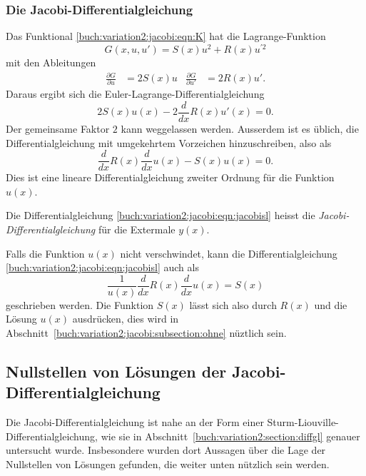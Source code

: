 \subsubsection{Die Jacobi-Differentialgleichung}
Das Funktional
\eqref{buch:variation2:jacobi:eqn:K}
hat die Lagrange-Funk\-tion 
\[
G(x,u,u') = S(x) u^2 + R(x) u^{\prime 2}
\]
mit den Ableitungen
\begin{align*}
\frac{\partial G}{\partial u}
&=
2S(x) u
&
\frac{\partial G}{\partial u'}
&=
2R(x) u'.
\end{align*}
Daraus ergibt sich die Euler-Lagrange-Differentialgleichung
\[
2S(x) u(x) - 2\frac{d}{dx} R(x) u'(x) = 0.
\]
Der gemeinsame Faktor $2$ kann weggelassen werden.
Ausserdem ist es üblich, die Differentialgleichung mit umgekehrtem
Vorzeichen hinzuschreiben, also als
\begin{equation}
\frac{d}{dx} R(x)\frac{d}{dx} u(x) - S(x) u(x) = 0.
\label{buch:variation2:jacobi:eqn:jacobisl}
\end{equation}
Dies ist eine lineare Differentialgleichung zweiter Ordnung für die Funktion
$u(x)$.

\begin{definition}
Die Differentialgleichung
\eqref{buch:variation2:jacobi:eqn:jacobisl}
heisst die {\em Jacobi-Differentialgleichung}
für die Extermale $y(x)$.
\end{definition}

Falls die Funktion $u(x)$ nicht verschwindet, kann die Differentialgleichung
\eqref{buch:variation2:jacobi:eqn:jacobisl}
auch als
\begin{equation}
\frac{1}{u(x)}
\frac{d}{dx} R(x)\frac{d}{dx} u(x) = S(x)
\label{buch:variation2:jacobi:eqn:jacobisl2}
\end{equation}
geschrieben werden.
Die Funktion $S(x)$ lässt sich also durch $R(x)$ und die Lösung $u(x)$
ausdrücken, dies wird in
Abschnitt~\ref{buch:variation2:jacobi:subsection:ohne}
nüztlich sein.

%
%
\subsection{Nullstellen von Lösungen der Jacobi-Differentialgleichung
\label{buch:variation2:jacobi:subection:nullstellen}}
Die Jacobi-Differentialgleichung ist nahe an der Form einer
Sturm-Liouville-Differential\-gleichung,
wie sie in Abschnitt~\ref{buch:variation2:section:diffgl} genauer
untersucht wurde.
Insbesondere wurden dort Aussagen über die Lage der Nullstellen von
Lösungen gefunden, die weiter unten nützlich sein werden.

